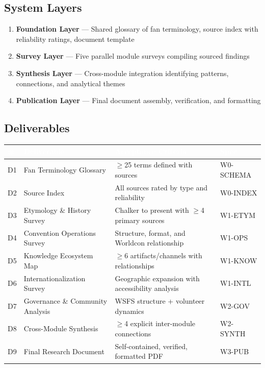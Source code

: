 \documentclass[11pt,letterpaper]{article}
\newcommand{\tableheader}[1]{\textbf{\sffamily\textcolor{white}{#1}}}
\begin{document}
\subsection{System Layers}

\begin{enumerate}[leftmargin=2em]
\item \textbf{Foundation Layer} --- Shared glossary of fan terminology, source index with reliability ratings, document template
\item \textbf{Survey Layer} --- Five parallel module surveys compiling sourced findings
\item \textbf{Synthesis Layer} --- Cross-module integration identifying patterns, connections, and analytical themes
\item \textbf{Publication Layer} --- Final document assembly, verification, and formatting
\end{enumerate}

\subsection{Deliverables}

\begin{center}
\begin{tabularx}{\textwidth}{C{0.8cm}L{3.5cm}L{3.5cm}X}
\toprule
{}
\tableheader{\#} & \tableheader{Deliverable} & \tableheader{Acceptance Criteria} & \tableheader{Spec} \\
\midrule
D1 & Fan Terminology Glossary & $\geq$25 terms defined with sources & W0-SCHEMA \\
D2 & Source Index & All sources rated by type and reliability & W0-INDEX \\
D3 & Etymology \& History Survey & Chalker to present with $\geq$4 primary sources & W1-ETYM \\
D4 & Convention Operations Survey & Structure, format, and Worldcon relationship & W1-OPS \\
D5 & Knowledge Ecosystem Map & $\geq$6 artifacts/channels with relationships & W1-KNOW \\
D6 & Internationalization Survey & Geographic expansion with accessibility analysis & W1-INTL \\
D7 & Governance \& Community Analysis & WSFS structure + volunteer dynamics & W2-GOV \\
D8 & Cross-Module Synthesis & $\geq$4 explicit inter-module connections & W2-SYNTH \\
D9 & Final Research Document & Self-contained, verified, formatted PDF & W3-PUB \\
\bottomrule
\end{tabularx}
\end{center}
\end{document}
